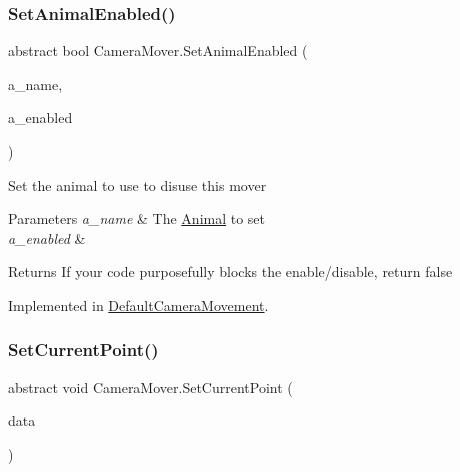 \mbox{\label{class_camera_mover_ae64e8ff4b4850290695f1cf1f7d866ba}} 
\subsubsection{\texorpdfstring{Set\+Animal\+Enabled()}{SetAnimalEnabled()}}
{\footnotesize\ttfamily abstract bool Camera\+Mover.\+Set\+Animal\+Enabled (\begin{DoxyParamCaption}\item[{\mbox{\hyperlink{_animal_8cs_a2fa5713399b84d1b88dae9196837af50}{A\+N\+I\+M\+A\+L\+\_\+\+N\+A\+ME}}}]{a\+\_\+name,  }\item[{bool}]{a\+\_\+enabled }\end{DoxyParamCaption})\hspace{0.3cm}{\ttfamily [pure virtual]}}



Set the animal to use to disuse this mover 


\begin{DoxyParams}{Parameters}
{\em a\+\_\+name} & The \mbox{\hyperlink{class_animal}{Animal}} to set\\
\hline
{\em a\+\_\+enabled} & \\
\hline
\end{DoxyParams}
\begin{DoxyReturn}{Returns}
If your code purposefully blocks the enable/disable, return false
\end{DoxyReturn}


Implemented in \mbox{\hyperlink{class_default_camera_movement_ad456298793af765ca6218d6951dd4973}{Default\+Camera\+Movement}}.

\mbox{\label{class_camera_mover_ab2f77d1df91324b508a7a45f1f22a04a}} 
\subsubsection{\texorpdfstring{Set\+Current\+Point()}{SetCurrentPoint()}}
{\footnotesize\ttfamily abstract void Camera\+Mover.\+Set\+Current\+Point (\begin{DoxyParamCaption}\item[{object}]{data }\end{DoxyParamCaption})\hspace{0.3cm}{\ttfamily [pure virtual]}}



